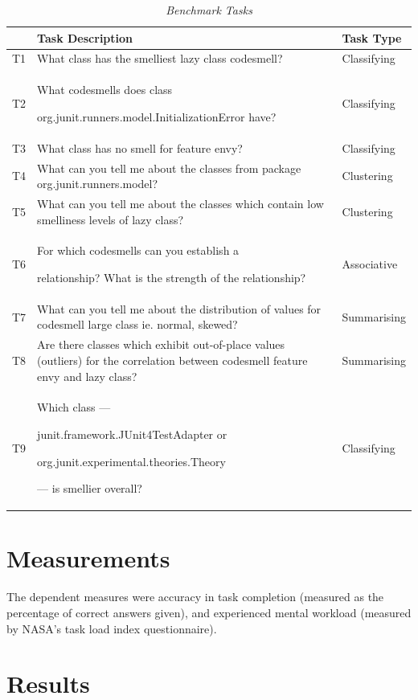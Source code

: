 \begin{table}
\centering
\caption{\textit{Benchmark Tasks}}
\begin{tabular}{|p{1cm}|p{8cm}|p{3cm}|} \hline
 &\textbf{Task Description} & \textbf{Task Type} \\ \hline
T1 & What class has the smelliest lazy class codesmell?  & Classifying \\\hline
T2& What codesmells does class\par org.junit.runners.model.InitializationError have? & Classifying \\\hline
T3& What class has no smell for feature envy?   & 
Classifying \\\hline
T4 & What can you tell me about the classes from package org.junit.runners.model?   & 
Clustering \\\hline
T5& What can you tell me about the classes which contain low smelliness levels of lazy class?  & 
Clustering \\\hline
T6& For which codesmells can you establish a\par  relationship? What is the strength of the relationship?  & 
Associative \\\hline
T7& What can you tell me about the distribution of values for codesmell large class ie. normal, skewed?  & 
Summarising \\\hline
T8& Are there classes which exhibit out-of-place values (outliers) for the correlation between codesmell feature envy and lazy class?   & 
Summarising \\\hline
T9 & Which class --- \par junit.framework.JUnit4TestAdapter or \par org.junit.experimental.theories.Theory\par --- is smellier overall?  & 
Classifying\\ 
\hline\end{tabular}
\label{tab:benchmarktasks}
\end{table}

\section{Measurements} \label{sect:exp3measurements}

The dependent measures were accuracy in task completion (measured as the percentage of correct answers given), and experienced mental workload (measured by NASA's task load index questionnaire).

\section{Results}\label{sect:exp3results}


